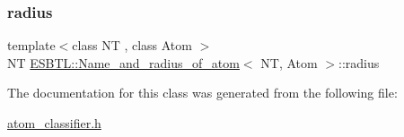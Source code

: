 \subsubsection{\texorpdfstring{radius}{radius}}
{\footnotesize\ttfamily template$<$class NT , class Atom $>$ \\
NT \hyperlink{classESBTL_1_1Name__and__radius__of__atom}{E\+S\+B\+T\+L\+::\+Name\+\_\+and\+\_\+radius\+\_\+of\+\_\+atom}$<$ NT, Atom $>$\+::radius}



The documentation for this class was generated from the following file\+:\begin{DoxyCompactItemize}
\item 
\hyperlink{atom__classifier_8h}{atom\+\_\+classifier.\+h}\end{DoxyCompactItemize}
